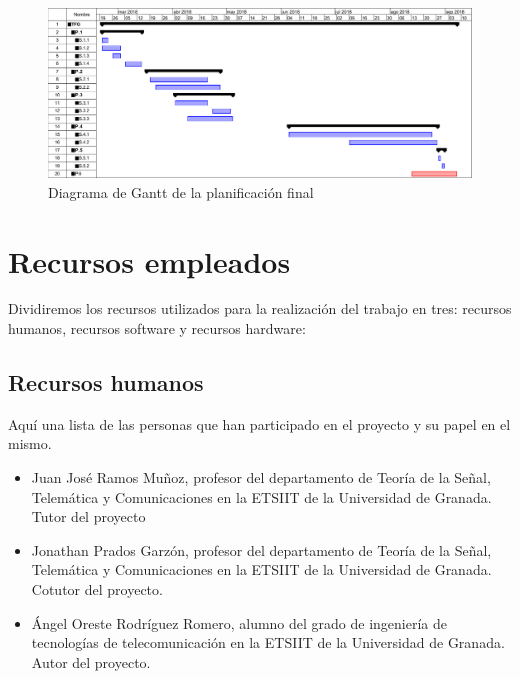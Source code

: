 \begin{figure}[H]
  \centering
  \includegraphics[scale=0.45]{imagenes/gant2}
  \caption{Diagrama de Gantt de la planificación final}
  \label{fig:gant2}
\end{figure}


\section{Recursos empleados}
Dividiremos los recursos utilizados para la realización del trabajo en tres: recursos humanos, recursos software y recursos hardware:

\subsection{Recursos humanos}
Aquí una lista de las personas que han participado en el proyecto y su papel en el mismo.
\begin{itemize}
\item Juan José Ramos Muñoz, profesor del departamento de Teoría de
la Señal, Telemática y Comunicaciones en la ETSIIT de la Universidad de Granada. Tutor del proyecto
\item Jonathan Prados Garzón, profesor del departamento de Teoría de
la Señal, Telemática y Comunicaciones en la ETSIIT de la Universidad de Granada.
Cotutor del proyecto.
\item Ángel Oreste Rodríguez Romero, alumno del grado de ingeniería de tecnologías de telecomunicación en la ETSIIT de la Universidad de Granada. Autor del proyecto.
\end{itemize}

